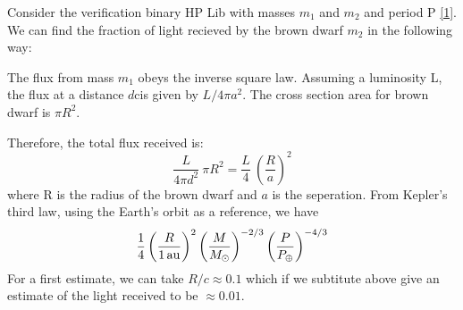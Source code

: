 \documentclass[10pt,a4paper]{article}
\begin{document}
Consider the verification binary HP Lib with masses $m_1$ and $m_2$ and period P \ref{1}. We can find the fraction of light recieved by the brown dwarf $m_2$ in the following way:

The flux from mass $m_1$ obeys the inverse square law. Assuming a luminosity L, the flux at a distance $d$cis given by $L/4 \pi a^2$. The cross section area for brown dwarf is $\pi R^2$.

Therefore, the total flux received is:
\begin{equation}
\frac{L}{4 \pi d^2} \ \pi R^2 = \frac{L}{4} \ \left(\frac{R}{a}\right)^2
\end{equation}
where R is the radius of the brown dwarf and $a$ is the seperation.
From Kepler's third law, using the Earth's orbit as a reference, we have
\begin{equation}
  \frac{1}{4} \left(\frac{R}{\rm 1\,au}\right)^2
  \left(\frac{M}{M_{\odot}}\right)^{-2/3}
  \left(\frac{P}{P_{\oplus}}\right)^{-4/3}
\end{equation}
For a first estimate, we can take $R/c \approx 0.1$ which if we subtitute above give an estimate of the light received to be $\approx 0.01$.



\end{document}

